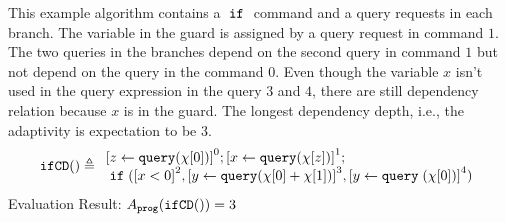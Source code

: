             \begin{example}
   \label{ex:ifCD}
   This example algorithm contains a $\;\mathtt{if}\;$ command and a query requests
   in each branch.
   The variable in the guard is assigned by a query request in command $1$.
   The two queries in the branches depend on the second query in command $1$
   but not depend on the query in the command $0$.
   Even though the variable $x$ isn't used in the query expression in the query $3$ and $4$,
   there are still dependency relation because $x$ is in the guard.
%
The longest dependency depth, i.e., the adaptivity is expectation to be $3$.
   \[
   \kw{ifCD()} \triangleq 
   \begin{array}{l}
\clabel{ \assign{z}{\query(\chi[0])}}^{0} ;
\clabel{\assign{x}{\query(\chi[z])} }^{1} ; \\
\eif(\clabel{x < 0}^{2}, 
\clabel{\assign{y}{\query(\chi[0] + \chi[1])}}^{3}, 
\clabel{\assign{y}\query{(\chi[0])}}^{4})
   \end{array}
   \]
   Evaluation Result: $ A_{\mathtt{prog}}( \mathtt{ifCD()}) = 3$
   \end{example}
    
